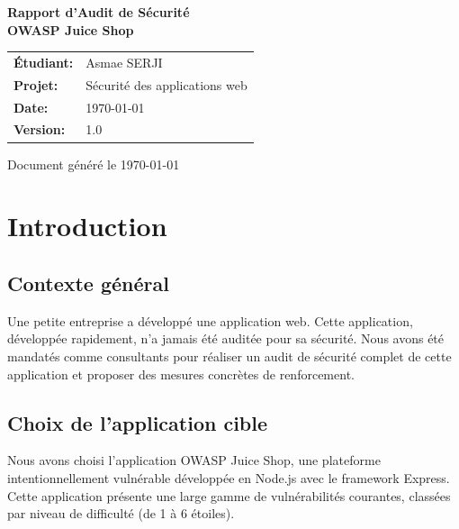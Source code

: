 \documentclass[12pt,a4paper]{report}
\begin{document}
\begin{titlepage}
    \centering
    \vspace*{2cm}
    {\Huge \textbf{Rapport d'Audit de Sécurité}}\\
    \vspace{0.5cm}
    {\LARGE \textbf{OWASP Juice Shop}}\\
    \vspace{1.5cm}
    \begin{tabular}{p{} p{}}
        \textbf{Étudiant:} & Asmae SERJI \\
        \textbf{Projet:} & Sécurité des applications web \\
        \textbf{Date:} & \today \\
        \textbf{Version:} & 1.0 \\
    \end{tabular}
    \vspace{2cm}
    \vfill
    {\small Document généré le \today}
\end{titlepage}

\tableofcontents
\listoffigures

\chapter{Introduction}

\section{Contexte général}
Une petite entreprise a développé une application web. Cette application, développée rapidement, n'a jamais été auditée pour sa sécurité. Nous avons été mandatés comme consultants pour réaliser un audit de sécurité complet de cette application et proposer des mesures concrètes de renforcement.

\section{Choix de l'application cible}
Nous avons choisi l'application OWASP Juice Shop, une plateforme intentionnellement vulnérable développée en Node.js avec le framework Express. Cette application présente une large gamme de vulnérabilités courantes, classées par niveau de difficulté (de 1 à 6 étoiles).
\end{document}
